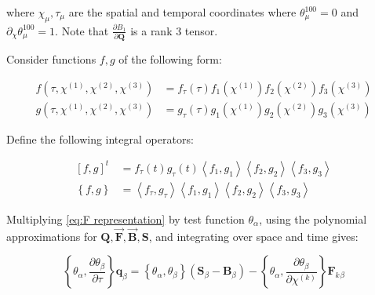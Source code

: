 \documentclass[twoside,english,final,5p,times,twocolumn]{elsarticle}
\begin{document}
where $\chi_{\mu},\tau_{\mu}$ are the spatial and temporal coordinates
where $\theta_{\mu}^{100}=0$ and $\partial_{\chi}\theta_{\mu}^{100}=1$.
Note that $\frac{\partial B_{1}}{\partial\boldsymbol{Q}}$ is a rank
3 tensor.

Consider functions $f,g$ of the following form:

\begin{subequations}

\begin{align}
f\left(\tau,\chi^{\left(1\right)},\chi^{\left(2\right)},\chi^{\left(3\right)}\right) & =f_{\tau}\left(\tau\right)f_{1}\left(\chi^{\left(1\right)}\right)f_{2}\left(\chi^{\left(2\right)}\right)f_{3}\left(\chi^{\left(3\right)}\right)\\
g\left(\tau,\chi^{\left(1\right)},\chi^{\left(2\right)},\chi^{\left(3\right)}\right) & =g_{\tau}\left(\tau\right)g_{1}\left(\chi^{\left(1\right)}\right)g_{2}\left(\chi^{\left(2\right)}\right)g_{3}\left(\chi^{\left(3\right)}\right)
\end{align}

\end{subequations}

Define the following integral operators:

\begin{subequations}

\begin{align}
\left[f,g\right]^{t} & =f_{\tau}\left(t\right)g_{\tau}\left(t\right)\left\langle f_{1},g_{1}\right\rangle \left\langle f_{2},g_{2}\right\rangle \left\langle f_{3},g_{3}\right\rangle \\
\left\{ f,g\right\}  & =\left\langle f_{\tau},g_{\tau}\right\rangle \left\langle f_{1},g_{1}\right\rangle \left\langle f_{2},g_{2}\right\rangle \left\langle f_{3},g_{3}\right\rangle 
\end{align}

\end{subequations}

Multiplying \eqref{eq:F representation} by test function $\theta_{\alpha}$,
using the polynomial approximations for $\boldsymbol{Q},\overrightarrow{\boldsymbol{F}},\overrightarrow{\boldsymbol{B}},\boldsymbol{S}$,
and integrating over space and time gives:

\begin{equation}
\left\{ \theta_{\alpha},\frac{\partial\theta_{\beta}}{\partial\tau}\right\} \boldsymbol{q}_{\beta}=\left\{ \theta_{\alpha},\theta_{\beta}\right\} \left(\boldsymbol{S}_{\beta}-\boldsymbol{B}_{\beta}\right)-\left\{ \theta_{\alpha},\frac{\partial\theta_{\beta}}{\partial\chi^{\left(k\right)}}\right\} \boldsymbol{F}_{k}{}_{\beta}\label{eq:conditions}
\end{equation}
\end{document}

